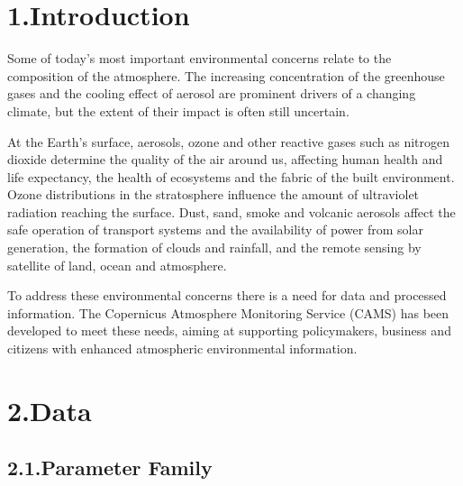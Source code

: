 \documentclass[9pt]{report}
\begin{document}
\mdxtitleblockstart{}
\mdxauthorstart{}
\mdxauthorend\mdtitleauthorrunning{}{}\mdxtitleblockend%

\section{1.\hspace*{0.5em}Introduction}\label{sec-introduction}%

\noindent{}Some of today’s most important environmental concerns relate to the 
composition of the atmosphere. The increasing concentration of the 
greenhouse gases and the cooling effect of aerosol are prominent 
drivers of a changing climate, but the extent of their impact is 
often still uncertain.%

At the Earth’s surface, aerosols, ozone and other reactive gases such as 
nitrogen dioxide determine the quality of the air around us, affecting 
human health and life expectancy, the health of ecosystems and the 
fabric of the built environment. Ozone distributions in the stratosphere 
influence the amount of ultraviolet radiation reaching the surface. 
Dust, sand, smoke and volcanic aerosols affect the safe operation of 
transport systems and the availability of power from solar generation, 
the formation of clouds and rainfall, and the remote sensing by satellite 
of land, ocean and atmosphere.%

To address these environmental concerns there is a need for data and 
processed information. The Copernicus Atmosphere Monitoring Service (CAMS) 
has been developed to meet these needs, aiming at supporting policymakers, 
business and citizens with enhanced atmospheric environmental information.%

\section{2.\hspace*{0.5em}Data}\label{sec-data}%

\subsection{2.1.\hspace*{0.5em}Parameter Family}\label{sec-parameter-family}%
\end{document}
